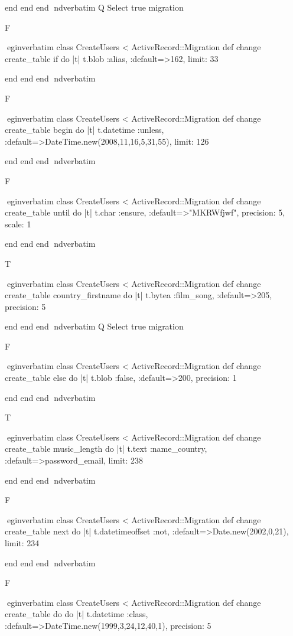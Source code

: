     end 
  end 
end
nd{verbatim}
Q
 Select true migration

F

egin{verbatim}
 class CreateUsers < ActiveRecord::Migration 
  def change 
    create_table if do |t| 
      t.blob :alias, :default=>162, limit: 33
    
    end 
  end 
end
nd{verbatim}

F

egin{verbatim}
 class CreateUsers < ActiveRecord::Migration 
  def change 
    create_table begin do |t| 
      t.datetime :unless, :default=>DateTime.new(2008,11,16,5,31,55), limit: 126
    
    end 
  end 
end
nd{verbatim}

F

egin{verbatim}
 class CreateUsers < ActiveRecord::Migration 
  def change 
    create_table until do |t| 
      t.char :ensure, :default=>"MKRWfjwf", precision: 5, scale: 1
    
    end 
  end 
end
nd{verbatim}

T

egin{verbatim}
 class CreateUsers < ActiveRecord::Migration 
  def change 
    create_table country_firstname do |t| 
      t.bytea :film_song, :default=>205, precision: 5
    
    end 
  end 
end
nd{verbatim}
Q
 Select true migration

F

egin{verbatim}
 class CreateUsers < ActiveRecord::Migration 
  def change 
    create_table else do |t| 
      t.blob :false, :default=>200, precision: 1
    
    end 
  end 
end
nd{verbatim}

T

egin{verbatim}
 class CreateUsers < ActiveRecord::Migration 
  def change 
    create_table music_length do |t| 
      t.text :name_country, :default=>password_email, limit: 238
    
    end 
  end 
end
nd{verbatim}

F

egin{verbatim}
 class CreateUsers < ActiveRecord::Migration 
  def change 
    create_table next do |t| 
      t.datetimeoffset :not, :default=>Date.new(2002,0,21), limit: 234
    
    end 
  end 
end
nd{verbatim}

F

egin{verbatim}
 class CreateUsers < ActiveRecord::Migration 
  def change 
    create_table do do |t| 
      t.datetime :class, :default=>DateTime.new(1999,3,24,12,40,1), precision: 5
    
